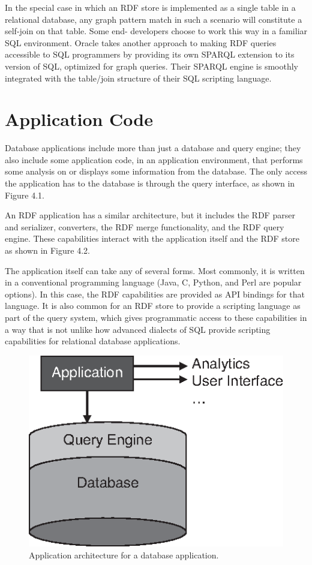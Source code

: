In the special case in which an RDF store is implemented as a single
table in a relational database, any graph pattern match in such a
scenario will constitute a self-join on that table. Some end- developers
choose to work this way in a familiar SQL environment. Oracle takes
another approach to making RDF queries accessible to SQL programmers by
providing its own SPARQL extension to its version of SQL, optimized for
graph queries. Their SPARQL engine is smoothly integrated with the
table/join structure of their SQL scripting language.

\section{Application Code}

Database applications include more than just a database and query
engine; they also include some application code, in an application
environment, that performs some analysis on or displays some information
from the database. The only access the application has to the database
is through the query interface, as shown in Figure 4.1.

An RDF application has a similar architecture, but it includes the RDF
parser and serializer, converters, the RDF merge functionality, and the
RDF query engine. These capabilities interact with the application
itself and the RDF store as shown in Figure 4.2.

The application itself can take any of several forms. Most commonly, it
is written in a conventional programming language (Java, C, Python, and
Perl are popular options). In this case, the RDF capabilities are
provided as API bindings for that language. It is also common for an RDF
store to provide a scripting language as part of the query system, which
gives programmatic access to these capabilities in a way that is not
unlike how advanced dialects of SQL provide scripting capabilities for
relational database applications.

\begin{figure}
    \centering
    \includegraphics[width=5.0in]{media/ch4/f04-01-9780123859655.eps}
    \caption{Application architecture for a database application.}
    \label{fig:ch4.1}
\end{figure}



